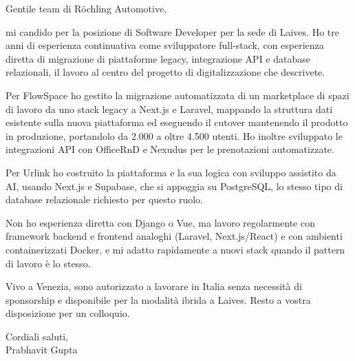 \documentclass[a4paper,11pt]{article}
\begin{document}
Gentile team di Röchling Automotive,

mi candido per la posizione di Software Developer per la sede di Laives. Ho tre anni di esperienza continuativa come sviluppatore full-stack, con esperienza diretta di migrazione di piattaforme legacy, integrazione API e database relazionali, il lavoro al centro del progetto di digitalizzazione che descrivete.

Per FlowSpace ho gestito la migrazione automatizzata di un marketplace di spazi di lavoro da uno stack legacy a Next.js e Laravel, mappando la struttura dati esistente sulla nuova piattaforma ed eseguendo il cutover mantenendo il prodotto in produzione, portandolo da 2.000 a oltre 4.500 utenti. Ho inoltre sviluppato le integrazioni API con OfficeRnD e Nexudus per le prenotazioni automatizzate.

Per Urlink ho costruito la piattaforma e la sua logica con sviluppo assistito da AI, usando Next.js e Supabase, che si appoggia su PostgreSQL, lo stesso tipo di database relazionale richiesto per questo ruolo.

Non ho esperienza diretta con Django o Vue, ma lavoro regolarmente con framework backend e frontend analoghi (Laravel, Next.js/React) e con ambienti containerizzati Docker, e mi adatto rapidamente a nuovi stack quando il pattern di lavoro è lo stesso.

Vivo a Venezia, sono autorizzato a lavorare in Italia senza necessità di sponsorship e disponibile per la modalità ibrida a Laives. Resto a vostra disposizione per un colloquio.

Cordiali saluti,\\
Prabhavit Gupta
\end{document}
